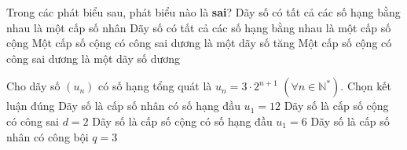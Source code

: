 

\begin{ex}%
	Trong các phát biểu sau, phát biểu nào là  \textbf{sai}?
	\choice 
		{Dãy số có tất cả các số hạng bằng nhau là một  cấp số nhân}
		{Dãy số có tất cả các số hạng bằng nhau  là một cấp số cộng}
		{Một cấp số cộng có công sai dương là  một dãy số tăng}
		{\True Một cấp số  cộng có công sai dương là một dãy số dương}
\end{ex}

\begin{ex}%
	Cho dãy số $(u_n)$ có số hạng tổng quát là $u_n = 3\cdot 2^{n+1}$  $(\forall n \in \mathbb{N}^*)$. Chọn kết luận đúng
	\choice 
		{\True Dãy số là cấp  số nhân có số hạng đầu $u_1 = 12$}
		{Dãy số là cấp số cộng có công sai $d = 2$} 
		 {Dãy số là cấp số cộng có số hạng đầu $u_1 = 6$}
		{Dãy số là cấp số nhân có công  bội $q = 3$}
\end{ex}

